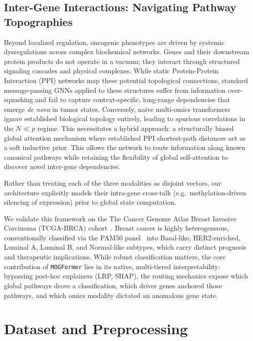 \documentclass[10pt, twocolumn]{article}
\begin{document}
\subsection*{Inter-Gene Interactions: Navigating Pathway Topographies}
Beyond localized regulation, oncogenic phenotypes are driven by systemic dysregulations across complex biochemical networks. Genes and their downstream protein products do not operate in a vacuum; they interact through structured signaling cascades and physical complexes. While static Protein-Protein Interaction (PPI) networks map these potential topological connections, standard message-passing GNNs applied to these structures suffer from information over-squashing and fail to capture context-specific, long-range dependencies that emerge \textit{de novo} in tumor states. Conversely, naive multi-omics transformers ignore established biological topology entirely, leading to spurious correlations in the $N \ll p$ regime. This necessitates a hybrid approach: a structurally biased global attention mechanism where established PPI shortest-path distances act as a soft inductive prior. This allows the network to route information along known canonical pathways while retaining the flexibility of global self-attention to discover novel inter-gene dependencies.


Rather than treating each of the three modalities as disjoint vectors, our architecture explicitly models
their intra-gene cross-talk (e.g.\ methylation-driven silencing of expression)
prior to global state computation.

We validate this framework on the The Cancer Genome Atlas Breast Invasive
Carcinoma (TCGA-BRCA) cohort~\cite{tcga2012brca}. Breast cancer is highly
heterogeneous, conventionally classified via the PAM50
panel~\cite{parker2009pam50} into Basal-like, HER2-enriched, Luminal A, Luminal B,
and Normal-like subtypes, which carry distinct prognosis and therapeutic
implications. While robust classification matters, the core contribution of
\texttt{MOGFormer} lies in its native, multi-tiered interpretability: bypassing
post-hoc explainers (LRP, SHAP), the routing mechanics expose which global
pathways drove a classification, which driver genes anchored those pathways, and
which omics modality dictated an anomalous gene state.

\section{Dataset and Preprocessing}
\end{document}
